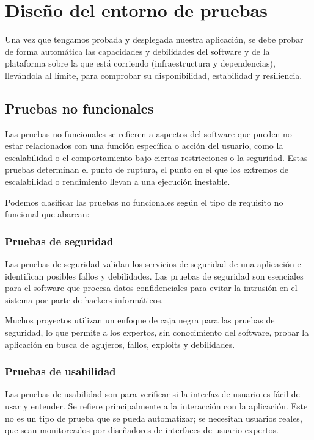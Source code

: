 \section{Diseño del entorno de pruebas}

Una vez que tengamos probada y desplegada nuestra aplicación, se debe probar de forma automática las capacidades y debilidades del software y de la plataforma sobre la que está corriendo (infraestructura y dependencias), llevándola al límite, para comprobar su disponibilidad, estabilidad y resiliencia.

\subsection{Pruebas no funcionales}

Las pruebas no funcionales se refieren a aspectos del software que pueden no estar relacionados con una función específica o acción del usuario, como la escalabilidad o el comportamiento bajo ciertas restricciones o la seguridad. Estas pruebas determinan el punto de ruptura, el punto en el que los extremos de escalabilidad o rendimiento llevan a una ejecución inestable.

Podemos clasificar las pruebas no funcionales según el tipo de requisito no funcional que abarcan:

\subsubsection{Pruebas de seguridad}

Las pruebas de seguridad validan los servicios de seguridad de una aplicación e identifican posibles fallos y debilidades. Las pruebas de seguridad son esenciales para el software que procesa datos confidenciales para evitar la intrusión en el sistema por parte de hackers informáticos.

Muchos proyectos utilizan un enfoque de caja negra para las pruebas de seguridad, lo que permite a los expertos, sin conocimiento del software, probar la aplicación en busca de agujeros, fallos, exploits y debilidades.

\subsubsection{Pruebas de usabilidad}

Las pruebas de usabilidad son para verificar si la interfaz de usuario es fácil de usar y entender. Se refiere principalmente a la interacción con la aplicación. Este no es un tipo de prueba que se pueda automatizar; se necesitan usuarios reales, que sean monitoreados por diseñadores de interfaces de usuario expertos.

